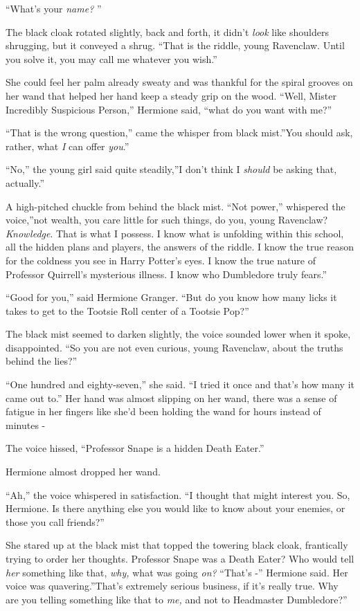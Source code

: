 ``What's your \emph{name?} ''

The black cloak rotated slightly, back and forth, it didn't \emph{look}
like shoulders shrugging, but it conveyed a shrug. ``That is the riddle,
young Ravenclaw. Until you solve it, you may call me whatever you
wish.''

She could feel her palm already sweaty and was thankful for the spiral
grooves on her wand that helped her hand keep a steady grip on the wood.
``Well, Mister Incredibly Suspicious Person,'' Hermione said, ``what do
you want with me?''

``That is the wrong question,'' came the whisper from black mist.''You
should ask, rather, what \emph{I} can offer \emph{you}.''

``No,'' the young girl said quite steadily,''I don't think I
\emph{should} be asking that, actually.''

A high-pitched chuckle from behind the black mist. ``Not power,''
whispered the voice,''not wealth, you care little for such things, do
you, young Ravenclaw? \emph{Knowledge}. That is what I possess. I know
what is unfolding within this school, all the hidden plans and players,
the answers of the riddle. I know the true reason for the coldness you
see in Harry Potter's eyes. I know the true nature of Professor
Quirrell's mysterious illness. I know who Dumbledore truly fears.''

``Good for you,'' said Hermione Granger. ``But do you know how many
licks it takes to get to the Tootsie Roll center of a Tootsie Pop?''

The black mist seemed to darken slightly, the voice sounded lower when
it spoke, disappointed. ``So you are not even curious, young Ravenclaw,
about the truths behind the lies?''

``One hundred and eighty-seven,'' she said. ``I tried it once and that's
how many it came out to.'' Her hand was almost slipping on her wand,
there was a sense of fatigue in her fingers like she'd been holding the
wand for hours instead of minutes -

The voice hissed, ``Professor Snape is a hidden Death Eater.''

Hermione almost dropped her wand.

``Ah,'' the voice whispered in satisfaction. ``I thought that might
interest you. So, Hermione. Is there anything else you would like to
know about your enemies, or those you call friends?''

She stared up at the black mist that topped the towering black cloak,
frantically trying to order her thoughts. Professor Snape was a Death
Eater? Who would tell \emph{her} something like that, \emph{why,} what
was going \emph{on?} ``That's -'' Hermione said. Her voice was
quavering.''That's extremely serious business, if it's really true. Why
are you telling something like that to \emph{me,} and not to Headmaster
Dumbledore?''

